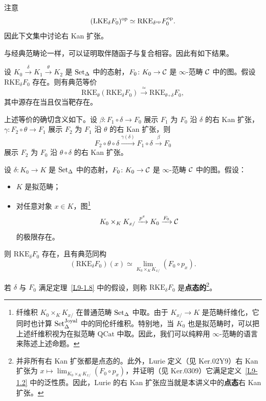 \nitem\label{L9-1.4} 注意
\[
(\mathrm{LKE}_\delta F_0)^{\mathrm{op}}\simeq\mathrm{RKE}_{\delta^{\mathrm{op}}}F_0^{\mathrm{op}}.
\]
因此下文集中讨论右 Kan 扩张。

\nitem\label{L9-1.5} 与经典范畴论一样，可以证明取伴随函子与复合相容。因此有如下结果。

\begin{proposition}\label{L9-1.6}
设 $K_0\xrightarrow{\delta}K_1\xrightarrow{\theta}K_2$ 是 $\operatorname{Set}_\Delta$ 中的态射，$F_0\colon K_0\to\mathcal{C}$ 是 $\infty$-范畴 $\mathcal{C}$ 中的图。假设 $\mathrm{RKE}_\delta F_0$ 存在。则有典范等价
\[
\mathrm{RKE}_\theta(\mathrm{RKE}_\delta F_0)\xrightarrow{\ \simeq\ }\mathrm{RKE}_{\theta\circ\delta}F_0,
\]
其中源存在当且仅当靶存在。
\end{proposition}

\begin{remark}\label{L9-1.7}
上述等价的确切含义如下。设 $\beta\colon F_1\circ\delta\to F_0$ 展示 $F_1$ 为 $F_0$ 沿 $\delta$ 的右 Kan 扩张，$\gamma\colon F_2\circ\theta\to F_1$ 展示 $F_2$ 为 $F_1$ 沿 $\theta$ 的右 Kan 扩张，则
\[
F_2\circ\theta\circ\delta\xrightarrow{\gamma(\delta)}F_1\circ\delta\xrightarrow{\beta}F_0
\]
展示 $F_2$ 为 $F_0$ 沿 $\theta\circ\delta$ 的右 Kan 扩张。
\end{remark}

\begin{theorem}\label{L9-1.8}
设 $\delta\colon K_0\to K$ 是 $\operatorname{Set}_\Delta$ 中的态射，$F_0\colon K_0\to\mathcal{C}$ 是 $\infty$-范畴 $\mathcal{C}$ 中的图。假设：
\begin{itemize}[leftmargin=2.2em,itemsep=0.1em]
\item $K$ 是拟范畴；
\item 对任意对象 $x\in K$，图\footnote{纤维积 $K_0\times_K K_{x/}$ 在普通范畴 $\operatorname{Set}_\Delta$ 中取。由于 $K_{x/}\to K$ 是范畴纤维化，它同时也计算 $\operatorname{Set}_\Delta^{\mathrm{Joyal}}$ 中的同伦纤维积。特别地，当 $K_0$ 也是拟范畴时，可以把上述纤维积视为在拟范畴 $\mathrm{QCat}$ 中取。因此，我们可以纯粹用 $\infty$-范畴的语言来陈述上述命题。}
\[
K_0\times_K K_{x/}\xrightarrow{p^x}K_0\xrightarrow{F_0}\mathcal{C}
\]
的极限存在。
\end{itemize}
则 $\mathrm{RKE}_\delta F_0$ 存在，且有典范同构
\begin{equation}\label{L9-eq1.3}
(\mathrm{RKE}_\delta F_0)(x)\simeq\lim_{K_0\times_K K_{x/}}(F_0\circ p_x).
\end{equation}
\end{theorem}

\begin{definition}\label{L9-1.9}
若 $\delta$ 与 $F_0$ 满足定理~\ref{L9-1.8} 中的假设，则称 $\mathrm{RKE}_\delta F_0$ 是\textbf{点态的}\footnote{并非所有右 Kan 扩张都是点态的。此外，Lurie 定义（见 Ker.02Y9）右 Kan 扩张为 $x\mapsto\lim_{K_0\times_K K_{x/}}(F_0\circ p_x)$，并证明（见 Ker.0309）它满足定义~\ref{L9-1.2} 中的泛性质。因此，Lurie 的右 Kan 扩张应当就是本讲义中的\textbf{点态}右 Kan 扩张。}。
\end{definition}

